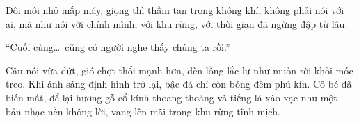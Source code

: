 \documentclass[../main.tex]{subfiles}
\begin{document}
Đôi môi nhỏ mấp máy, giọng thì thầm tan trong không khí, không phải nói với ai, mà như nói với chính mình, với khu rừng, với thời gian đã ngừng đập từ lâu:

\begin{center}
  ``Cuối cùng\dots\ cũng có người nghe thấy chúng ta rồi.''
\end{center}

Câu nói vừa dứt, gió chợt thổi mạnh hơn, đèn lồng lắc lư như muốn rời khỏi móc treo. Khi ánh sáng định hình trở lại, bậc đá chỉ còn bóng đêm phủ kín. Cô bé đã biến mất, để lại hương gỗ cổ kính thoang thoảng và tiếng lá xào xạc như một bản nhạc nền không lời, vang lên mãi trong khu rừng tĩnh mịch.
\end{document}
